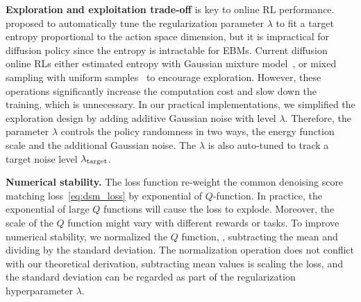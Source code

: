 \textbf{Exploration and exploitation trade-off} is key to online RL performance. \citet{haarnoja2018soft2} proposed to automatically tune the regularization parameter $\lambda$ to fit a target entropy proportional to the action space dimension, but it is impractical for diffusion policy since the entropy is intractable for EBMs. 
Current diffusion online RLs either estimated entropy with Gaussian mixture model~\cite{wang2024diffusion}, or mixed sampling with uniform samples~\cite{ding2024diffusion} to encourage exploration. However, these operations significantly increase the computation cost and slow down the training, which is unnecessary. In our practical implementations, we simplified the exploration design by adding additive Gaussian noise with level $\lambda$. Therefore, the parameter $\lambda$ controls the policy randomness in two ways, the energy function scale and the additional Gaussian noise. The $\lambda$ is also auto-tuned to track a target noise level $\lambda_{\rm target}$. 
        

\textbf{Numerical stability.} The loss function re-weight the common denoising score matching loss~\eqref{eq:dsm_loss} by exponential of $Q$-function. In practice, the exponential of large $Q$ functions will cause the loss to explode. Moreover, the scale of the $Q$ function might vary with different rewards or tasks. To improve numerical stability, we normalized the $Q$ function, \ie, subtracting the mean and dividing by the standard deviation. The normalization operation does not conflict with our theoretical derivation, subtracting mean values is scaling the loss, and the standard deviation can be regarded as part of the regularization hyperparameter $\lambda$.

